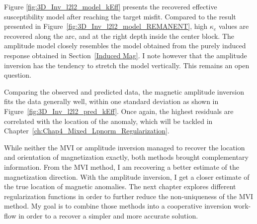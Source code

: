 Figure \ref{fig:3D_Inv_l2l2_model_kEff} presents the recovered effective susceptibility model after reaching the target misfit.
Compared to the result presented in Figure~\ref{fig:3D_Inv_l2l2_model_REMANENT}, high $\kappa_e$ values are recovered along the arc, and at the right depth inside the center block.
The amplitude model closely resembles the model obtained from the purely induced response obtained in Section~\ref{Induced Mag}.
I note however that the amplitude inversion has the tendency to stretch the model vertically.
This remains an open question.

Comparing the observed and predicted data, the magnetic amplitude inversion fits the data generally well, within one standard deviation as shown in Figure~\ref{fig:3D_Inv_l2l2_pred_kEff}.
Once again, the highest residuals are correlated with the location of the anomaly, which will be tackled in Chapter~\ref{ch:Chap4_Mixed_Lpnorm_Regularization}.

While neither the MVI or amplitude inversion managed to recover the location and orientation of magnetization exactly, both methods brought complementary information. From the MVI method, I am recovering a better estimate of the magnetization direction. With the  amplitude inversion, I get a closer estimate of the true location of magnetic anomalies. 
The next chapter explores different regularization functions in order to further reduce the non-uniqueness of the MVI method.
My goal is to combine those methods into a cooperative inversion work-flow in order to a recover a simpler and more accurate solution.


